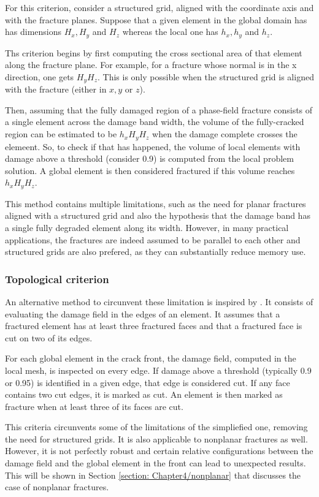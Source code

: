 For this criterion, consider a structured grid, aligned with the coordinate axis and with the fracture planes. Suppose that a given element in the global domain has has dimensions $H_x, H_y$ and $H_z$ whereas the local one has $h_x, h_y$ and $h_z$.

Ths criterion begins by first computing the cross sectional area of that element along the fracture plane. For example, for a fracture whose normal is in the x direction, one gets $H_yH_z$. This is only possible when the structured grid is aligned with the fracture (either in $x, y$ or $z$).

Then, assuming that the fully damaged region of a phase-field fracture consists of a single element across the damage band width, the volume of the fully-cracked region can be estimated to be $h_xH_yH_z$ when the damage complete crosses the elemeent. So, to check if that has happened, the volume of local elements with damage above a threshold (consider 0.9) is computed from the local problem solution. A global element is then considered fractured if this volume reaches $h_xH_yH_z$.

This method contains multiple limitations, such as the need for planar fractures aligned with a structured grid and also the hypothesis that the damage band has a single fully degraded element along its width. However, in many practical applications, the fractures are indeed assumed to be parallel to each other and structured grids are also prefered, as they can substantially reduce memory use. 

\subsubsection{Topological criterion}

An alternative method to circunvent these limitation is inspired by \cite{muixi2021combined}. It consists of evaluating the damage field in the edges of an element. It assumes that a fractured element has at least three fractured faces and that a fractured face is cut on two of its edges.

For each global element in the crack front, the damage field, computed in the local mesh, is inspected on every edge. If damage above a threshold (typically 0.9 or 0.95) is identified in a given edge, that edge is considered cut. If any face contains two cut edges, it is marked as cut. An element is then marked as fracture when at least three of its faces are cut.

This criteria circunvents some of the limitations of the simpliefied one, removing the need for structured grids. It is also applicable to nonplanar fractures as well. However, it is not perfectly robust and certain relative configurations between the damage field and the global element in the front can lead to unexpected results. This will be shown in Section \ref{section: Chapter4/nonplanar} that discusses the case of nonplanar fractures.
